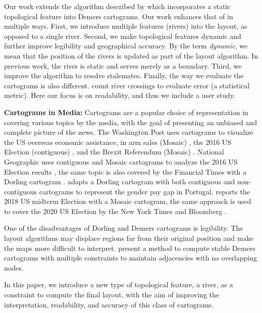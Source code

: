 \documentclass[Afour,sagev,times]{sagej}
\newcommand{\bobgraph}[1]{\noindent\textbf{#1}}
\begin{document}
Our work extends the algorithm described by \citet{tong2018Cartograms} which incorporates a static topological feature into Demers cartograms. Our work enhances that of \citet{tong2018Cartograms} in multiple ways. First, we introduce multiple features (rivers) into the layout, as opposed to a single river. Second, we make topological features dynamic and further improve legibility and geographical accuracy. By the term \textit{dynamic}, we mean that the position of the rivers is updated as part of the layout algorithm. In previous work, the river is static and serves merely as a boundary. Third, we improve the algorithm to resolve stalemates. Finally, the way we evaluate the cartograms is also different. \citet{tong2018Cartograms} count river crossings to evaluate error (a statistical metric). Here our focus is on readability, and thus we include a user study.

\bobgraph{Cartograms in Media: }Cartograms are a popular choice of representation in covering various topics by the media, with the goal of presenting an unbiased and complete picture of the news. The Washington Post uses cartograms to visualize the US overseas economic assistance, in arm sales (Mosaic) \cite{bearak2016Everything}, the 2016 US Election (contiguous) \cite{gamio2016Election}, and the Brexit Referendum (Mosaic) \cite{taylor2016What}. National Geographic uses contiguous and Mosaic cartograms to analyze the 2016 US Election results \cite{miller2016Election}, the same topic is also covered by the Financial Times with a Dorling cartogram \cite{stabe2016Search}. \citet{cruz2017Adapted} adapts a Dorling cartogram with both contiguous and non-contiguous cartograms to represent the gender pay gap in Portugal. \citet{sandberg2018Cartogram} reports the 2018 US midterm Election with a Mosaic cartogram, the same approach is used to cover the 2020 US Election by the New York Times \cite{thelearningnetwork2020What} and Bloomberg \cite{mccartney20202020}.

One of the disadvantages of Dorling and Demers cartograms is legibility. The layout algorithms may displace regions far from their original position and make the maps more difficult to interpret. \citet{nickel2022Multicriteria} present a method to compute stable Demers cartograms with multiple constraints to maintain adjacencies with no overlapping nodes.

In this paper, we introduce a new type of topological feature, a river, as a constraint to compute the final layout, with the aim of improving the interpretation, readability, and accuracy of this class of cartograms.
\end{document}

